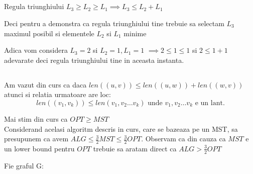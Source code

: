 \documentclass[a4paper]{report} %
\begin{document}
\subsection{}

Regula triunghiului $L_{3}\geq L_{2} \geq L_{1} \implies L_{3}\leq L_{2} + L_{1}$

Deci pentru a demonstra ca regula triunghiului tine trebuie sa selectam $L_{3}$ maximul posibil si elementele $L_{2}$ si $L_{1}$ minime

Adica vom considera $L_{3}=2$ si $L_{2}=1, L_{1}=1$ $\implies 2\leq 1 \leq 1$ si $2\leq 1 + 1$ adevarate deci regula triunghiului tine in aceasta instanta. 

\subsection{}

Am vazut din curs ca daca $len((u,v))\leq len((u,w)) + len((w,v))$ atunci si relatia urmatoare are loc:
\[len((v_{1},v_{k}))\leq len(v_{1},v_{2} \dots v_{k}) \text{ unde } v_{1},v_{2} \dots v_{k} \text{ e un lant.}\]

Mai stim din curs ca $OPT\geq MST$\\

Considerand acelasi algoritm descris in curs, care se bazeaza pe un MST, sa presupunem ca avem $ALG\leq \frac{3}{2}MST \leq\frac{3}{2}OPT$. Observam ca din cauza ca $MST$
e un lower bound pentru $OPT$ trebuie sa aratam direct ca $ALG> \frac{3}{2}OPT$

Fie graful G:\\

\end{document}
